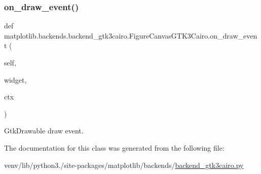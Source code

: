 \subsubsection{\texorpdfstring{on\+\_\+draw\+\_\+event()}{on\_draw\_event()}}
{\footnotesize\ttfamily def matplotlib.\+backends.\+backend\+\_\+gtk3cairo.\+Figure\+Canvas\+G\+T\+K3\+Cairo.\+on\+\_\+draw\+\_\+event (\begin{DoxyParamCaption}\item[{}]{self,  }\item[{}]{widget,  }\item[{}]{ctx }\end{DoxyParamCaption})}

\begin{DoxyVerb}GtkDrawable draw event.\end{DoxyVerb}
 

The documentation for this class was generated from the following file\+:\begin{DoxyCompactItemize}
\item 
venv/lib/python3./site-\/packages/matplotlib/backends/\hyperlink{backend__gtk3cairo_8py}{backend\+\_\+gtk3cairo.\+py}\end{DoxyCompactItemize}
